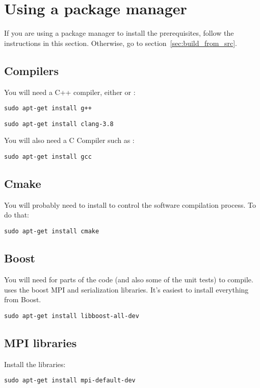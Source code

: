 \documentclass[11pt,fleqn]{book} %
\begin{document}
\section{Using a package manager}
If you are using a package manager to install the prerequisites, follow the instructions
in this section.  Otherwise, go to section~\ref{sec:build_from_src}.

\subsection{Compilers}
You will need a C++ compiler, either  or :
\begin{lstlisting}[backgroundcolor=\color{background}]
sudo apt-get install g++
\end{lstlisting}
\begin{lstlisting}[backgroundcolor=\color{background}]
sudo apt-get install clang-3.8
\end{lstlisting}

You will also need a C Compiler such as :
\begin{lstlisting}[backgroundcolor=\color{background}]
sudo apt-get install gcc
\end{lstlisting}

\subsection{Cmake}
You will probably need to install  to control the software compilation process. To do that:
\begin{lstlisting}[backgroundcolor=\color{background}]
     sudo apt-get install cmake
\end{lstlisting}

\subsection{Boost}
You will need  for parts of the code (and also some of the unit tests) to compile.
\GranularSim uses the boost MPI and serialization libraries.  It's easiest to install everything from Boost.
\begin{lstlisting}[backgroundcolor=\color{background}]
sudo apt-get install libboost-all-dev
\end{lstlisting}

\subsection{MPI libraries}
Install the  libraries:
\begin{lstlisting}[backgroundcolor=\color{background}]
sudo apt-get install mpi-default-dev
\end{lstlisting}
\end{document}
